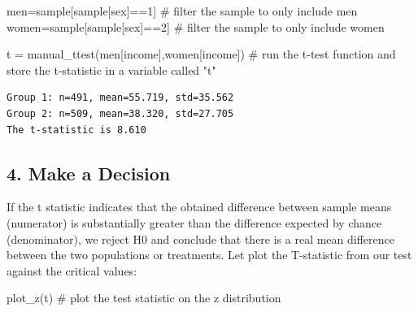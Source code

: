 \documentclass[
  letterpaper,
  DIV=11,
  numbers=noendperiod]{scrreprt}
\newenvironment{Shaded}{\begin{snugshade}}{\end{snugshade}}
\newcommand{\CommentTok}[1]{\textcolor[rgb]{0.37,0.37,0.37}{#1}}
\newcommand{\DecValTok}[1]{\textcolor[rgb]{0.68,0.00,0.00}{#1}}
\newcommand{\NormalTok}[1]{\textcolor[rgb]{0.00,0.23,0.31}{#1}}
\newcommand{\OperatorTok}[1]{\textcolor[rgb]{0.37,0.37,0.37}{#1}}
\newcommand{\StringTok}[1]{\textcolor[rgb]{0.13,0.47,0.30}{#1}}
\begin{document}
\begin{Shaded}
\begin{Highlighting}[]
\NormalTok{men}\OperatorTok{=}\NormalTok{sample[sample[}\StringTok{\textquotesingle{}sex\textquotesingle{}}\NormalTok{]}\OperatorTok{==}\DecValTok{1}\NormalTok{] }\CommentTok{\# filter the sample to only include men}
\NormalTok{women}\OperatorTok{=}\NormalTok{sample[sample[}\StringTok{\textquotesingle{}sex\textquotesingle{}}\NormalTok{]}\OperatorTok{==}\DecValTok{2}\NormalTok{] }\CommentTok{\# filter the sample to only include women}

\NormalTok{t }\OperatorTok{=}\NormalTok{ manual\_ttest(men[}\StringTok{\textquotesingle{}income\textquotesingle{}}\NormalTok{],women[}\StringTok{\textquotesingle{}income\textquotesingle{}}\NormalTok{]) }\CommentTok{\# run the t{-}test function and store the t{-}statistic in a variable called "t"}
\end{Highlighting}
\end{Shaded}

\begin{verbatim}
Group 1: n=491, mean=55.719, std=35.562
Group 2: n=509, mean=38.320, std=27.705
The t-statistic is 8.610
\end{verbatim}

\hypertarget{make-a-decision}{%
\subsection{4. Make a Decision}\label{make-a-decision}}

If the t statistic indicates that the obtained difference between sample
means (numerator) is substantially greater than the difference expected
by chance (denominator), we reject H0 and conclude that there is a real
mean difference between the two populations or treatments. Let plot the
T-statistic from our test against the critical values:

\begin{Shaded}
\begin{Highlighting}[]
\NormalTok{plot\_z(t) }\CommentTok{\# plot the test statistic on the z distribution}
\end{Highlighting}
\end{Shaded}
\end{document}
